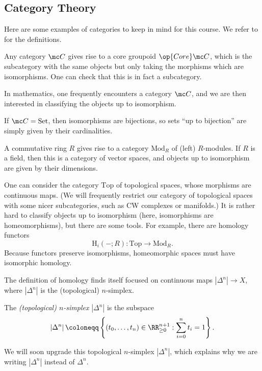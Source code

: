 \documentclass[../notes.tex]{subfiles}
\begin{document}
\subsection{Category Theory}
Here are some examples of categories to keep in mind for this course. We refer to  for the definitions.
\begin{example}
	Any category $\mc C$ gives rise to a core groupoid $\op{Core}\mc C$, which is the subcategory with the same objects but only taking the morphisms which are isomorphisms. One can check that this is in fact a subcategory.
\end{example}
In mathematics, one frequently encounters a category $\mc C$, and we are then interested in classifying the objects up to isomorphism.
\begin{example}
	If $\mc C=\mathrm{Set}$, then isomorphisms are bijections, so sets ``up to bijection'' are simply given by their cardinalities.
\end{example}
\begin{example}
	A commutative ring $R$ gives rise to a category $\mathrm{Mod}_R$ of (left) $R$-modules. If $R$ is a field, then this is a category of vector spaces, and objects up to isomorphism are given by their dimensions.
\end{example}
\begin{example}
	One can consider the category $\mathrm{Top}$ of topological spaces, whose morphisms are continuous maps. (We will frequently restrict our category of topological spaces with some nicer subcategories, such as CW complexes or manifolds.) It is rather hard to classify objects up to isomorphism (here, isomorphisms are homeomorphisms), but there are some tools. For example, there are homology functors
	\[\mathrm H_i(-;R)\colon\mathrm{Top}\to\mathrm{Mod}_R.\]
	Because functors preserve isomorphisms, homeomorphic spaces must have isomorphic homology.
\end{example}
The definition of homology finds itself focused on continuous maps $\left|\Delta^n\right|\to X$, where $\left|\Delta^n\right|$ is the (topological) $n$-simplex.
\begin{defihelper}[$n$-simplex] 
	The \textit{(topological) $n$-simplex} $\left|\Delta^n\right|$ is the subspace
	\[\left|\Delta^n\right|\coloneqq\left\{(t_0,\ldots,t_n)\in\RR_{\ge0}^{n+1}:\sum_{i=0}^nt_i=1\right\}.\]
\end{defihelper}
We will soon upgrade this topological $n$-simplex $\left|\Delta^n\right|$, which explains why we are writing $\left|\Delta^n\right|$ instead of $\Delta^n$.
\end{document}
